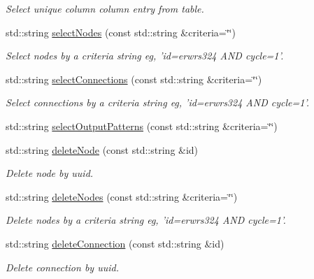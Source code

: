 \begin{DoxyCompactItemize}
\begin{DoxyCompactList}\small\item\em \-Select unique column column entry from table. \end{DoxyCompactList}\item 
std\-::string \hyperlink{classcryomesh_1_1manager_1_1DatabaseManager_abbdc677c45f6cf24e46f9ab4f1d15804}{select\-Nodes} (const std\-::string \&criteria=\char`\"{}\char`\"{})
\begin{DoxyCompactList}\small\item\em \-Select nodes by a criteria string eg, 'id=erwrs324 \-A\-N\-D cycle=1'. \end{DoxyCompactList}\item 
std\-::string \hyperlink{classcryomesh_1_1manager_1_1DatabaseManager_a293d93aa671e648edb0dc8a47663e7d0}{select\-Connections} (const std\-::string \&criteria=\char`\"{}\char`\"{})
\begin{DoxyCompactList}\small\item\em \-Select connections by a criteria string eg, 'id=erwrs324 \-A\-N\-D cycle=1'. \end{DoxyCompactList}\item 
std\-::string \hyperlink{classcryomesh_1_1manager_1_1DatabaseManager_a9a49d50bc76aa1686da01b9ebe3bbc8b}{select\-Output\-Patterns} (const std\-::string \&criteria=\char`\"{}\char`\"{})
\item 
std\-::string \hyperlink{classcryomesh_1_1manager_1_1DatabaseManager_a95b3a22e66f6803e9b9875fc9d522218}{delete\-Node} (const std\-::string \&id)
\begin{DoxyCompactList}\small\item\em \-Delete node by uuid. \end{DoxyCompactList}\item 
std\-::string \hyperlink{classcryomesh_1_1manager_1_1DatabaseManager_aae668efd45d2f48593e7e7810ecfa0c2}{delete\-Nodes} (const std\-::string \&criteria=\char`\"{}\char`\"{})
\begin{DoxyCompactList}\small\item\em \-Delete nodes by a criteria string eg, 'id=erwrs324 \-A\-N\-D cycle=1'. \end{DoxyCompactList}\item 
std\-::string \hyperlink{classcryomesh_1_1manager_1_1DatabaseManager_a9dcb39c5eda5a6aa91addb20b8090968}{delete\-Connection} (const std\-::string \&id)
\begin{DoxyCompactList}\small\item\em \-Delete connection by uuid. \end{DoxyCompactList}\item 

\end{DoxyCompactItemize}
